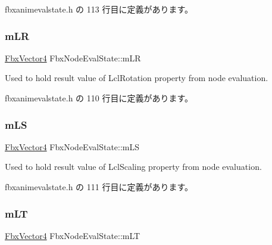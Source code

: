  fbxanimevalstate.\+h の 113 行目に定義があります。

\mbox{\label{class_fbx_node_eval_state_ac630f31b0915572e2a4e248b20c3b447}} 
\subsubsection{\texorpdfstring{m\+LR}{mLR}}
{\footnotesize\ttfamily \hyperlink{class_fbx_vector4}{Fbx\+Vector4} Fbx\+Node\+Eval\+State\+::m\+LR}



Used to hold result value of Lcl\+Rotation property from node evaluation. 



 fbxanimevalstate.\+h の 110 行目に定義があります。

\mbox{\label{class_fbx_node_eval_state_a6e1f5d4bf262b03068164d7d0e3641bd}} 
\subsubsection{\texorpdfstring{m\+LS}{mLS}}
{\footnotesize\ttfamily \hyperlink{class_fbx_vector4}{Fbx\+Vector4} Fbx\+Node\+Eval\+State\+::m\+LS}



Used to hold result value of Lcl\+Scaling property from node evaluation. 



 fbxanimevalstate.\+h の 111 行目に定義があります。

\mbox{\label{class_fbx_node_eval_state_a06f62c625cb7095d6334a21ba5cde42d}} 
\subsubsection{\texorpdfstring{m\+LT}{mLT}}
{\footnotesize\ttfamily \hyperlink{class_fbx_vector4}{Fbx\+Vector4} Fbx\+Node\+Eval\+State\+::m\+LT}



